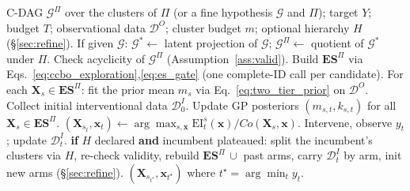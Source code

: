 \documentclass[twoside]{article}
\newcommand{\QCBO}{\textsc{QCBO}}
\newcommand{\Gg}{\mathcal{G}}
\newcommand{\Gq}{\mathcal{G}^{\Pi}}
\newcommand{\ESpi}{\mathbf{ES}^{\Pi}}
\begin{document}
\begin{algorithm}[t]
\caption{\QCBO{}: Quotient Causal Bayesian Optimization}
\label{alg:ccbo}
\begin{algorithmic}[1]
\REQUIRE C-DAG $\Gq$ over the clusters of $\Pi$ (or a fine hypothesis $\Gg$ and
$\Pi$); target $Y$; budget $T$; observational data $\mathcal{D}^{O}$; cluster
budget $m$; optional hierarchy $H$ (\S\ref{sec:refine}).
\STATE If given $\Gg$: $\Gg^*\leftarrow$ latent projection of $\Gg$;\quad
$\Gq\leftarrow$ quotient of $\Gg^*$ under $\Pi$. Check acyclicity of $\Gq$
(Assumption~\ref{ass:valid}).
\STATE Build $\ESpi$ via Eqs.~\eqref{eq:ccbo_exploration},\eqref{eq:es_gate} (one
complete-ID call per candidate).
\STATE For each $\mathbf{X}_s\in\ESpi$: fit the prior mean $m_s$ via
Eq.~\eqref{eq:two_tier_prior} on $\mathcal{D}^{O}$.
\STATE Collect initial interventional data $\mathcal{D}^{I}_0$.
  \STATE Update GP posteriors $(m_{s,t},k_{s,t})$ for all $\mathbf{X}_s\in\ESpi$.
  \STATE $(\mathbf{X}_{s_t},\mathbf{x}_t)\leftarrow\arg\max_{s,\mathbf{x}}
  \mathrm{EI}^{s}_{t}(\mathbf{x})/Co(\mathbf{X}_s,\mathbf{x})$.
  \STATE Intervene, observe $y_t$; update $\mathcal{D}^{I}_t$.
  \STATE \textbf{if} $H$ declared \textbf{and} incumbent plateaued: split the
  incumbent's clusters via $H$, re-check validity, rebuild
  $\ESpi\,\cup$ past arms, carry $\mathcal{D}^{I}_t$ by arm, init new arms
  (\S\ref{sec:refine}).
\ENDFOR
\RETURN $(\mathbf{X}_{s_{t^\star}},\mathbf{x}_{t^\star})$ where $t^\star=\arg\min_t y_t$.
\end{algorithmic}
\end{algorithm}
\end{document}
